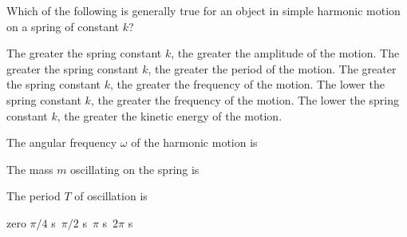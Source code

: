 \documentclass{../../../oss-apphys-exam}
\newcounter{lastmc}
\begin{document}
\begin{questions}
  \question Which of the following is generally true for an object in simple
  harmonic motion on a spring of constant $k$?
  \begin{choices}
    \choice The greater the spring constant $k$, the greater the amplitude of
    the motion.
    \choice The greater the spring constant $k$, the greater the period of
    the motion.
    \choice The greater the spring constant $k$, the greater the frequency of
    the motion.
    \choice The lower the spring constant $k$, the greater the frequency of
    the motion.
    \choice The lower the spring constant $k$, the greater the kinetic energy
    of the motion.
  \end{choices}
  \newpage
  

  \question The angular frequency $\omega$ of the harmonic motion is
  \label{first}

  \question The mass $m$ oscillating on the spring is
    
  \question The period $T$ of oscillation is
  \begin{choices}
    \choice zero
    \choice $\pi/4$ \si\second
    \choice $\pi/2$ \si\second
    \choice $\pi$ \si\second
    \choice $2\pi$ \si\second
  \end{choices}
  \label{last}
\end{questions}
\setcounter{lastmc}{\value{question}}
\newpage

\end{document}
